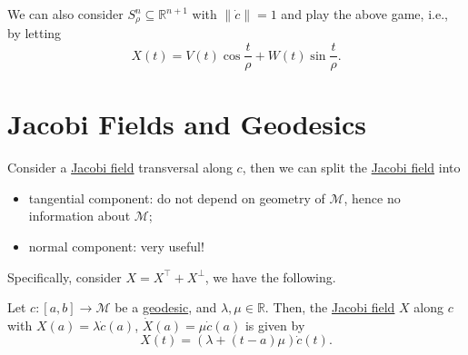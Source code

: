 \begin{remark}
	We can also consider \(S^n_{\rho } \subseteq \mathbb{R} ^{n+1}\) with \(\lVert \dot{c} \rVert = 1\) and play the above game, i.e., by letting
	\[
		X(t) = V(t) \cos \frac{t}{\rho } + W(t) \sin \frac{t}{\rho }.
	\]
\end{remark}

\section{Jacobi Fields and Geodesics}

Consider a \hyperref[def:Jacobi-field]{Jacobi field} transversal along \(c\), then we can split the \hyperref[def:Jacobi-field]{Jacobi field} into
\begin{itemize}
	\item tangential component: do not depend on geometry of \(\mathcal{M} \), hence no information about \(\mathcal{M} \);
	\item normal component: very useful!
\end{itemize}
Specifically, consider \(X = X^{\top} + X^{\perp} \), we have the following.

\begin{lemma}
	Let \(c\colon [a, b] \to \mathcal{M} \) be a \hyperref[def:geodesic]{geodesic}, and \(\lambda , \mu \in \mathbb{R} \). Then, the \hyperref[def:Jacobi-field]{Jacobi field} \(X\) along \(c\) with \(X(a) = \lambda \dot{c} (a)\), \(\dot{X} (a) = \mu \dot{c} (a)\) is given by
	\[
		X(t) = (\lambda + (t-a)\mu )\dot{c}(t).
	\]
\end{lemma}